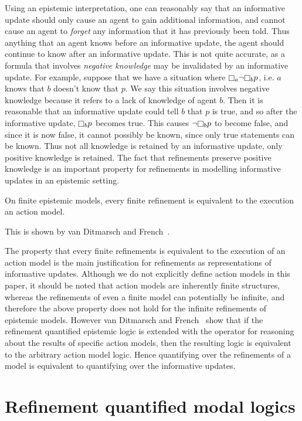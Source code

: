 Using an epistemic interpretation, one can reasonably say that an informative
update should only cause an agent to gain additional information, and cannot
cause an agent to {\em forget} any information that it has previously been told.
Thus anything that an agent knows before an informative update, the agent should
continue to know after an informative update. This is not quite accurate, as a
formula that involves {\em negative knowledge} may be invalidated by an
informative update. For example, suppose that we have a situation where
$\knows_a \neg \knows_b p$, i.e. $a$ knows that $b$ doesn't know that $p$. We
say this situation involves negative knowledge because it refers to a lack of
knowledge of agent $b$. Then it is reasonable that an informative update could
tell $b$ that $p$ is true, and so after the informative update, $\knows_b p$
becomes true.  This causes $\neg \knows_b p$ to become false, and since it is
now false, it cannot possibly be known, since only true statements can be
known. Thus not all knowledge is retained by an informative update, only
positive knowledge is retained. The fact that refinements preserve positive
knowledge is an important property for refinements in modelling informative
updates in an epistemic setting.

\begin{proposition}
On finite epistemic models, every finite refinement is equivalent to the
execution an action model.
\end{proposition}

This is shown by van Ditmarsch and French~\cite{french2009simulation}.

The property that every finite refinements is equivalent to the execution of an
action model is the main justification for refinements as representations of
informative updates. Although we do not explicitly define action models in this
paper, it should be noted that action models are inherently finite structures,
whereas the refinements of even a finite model can potentially be infinite, and
therefore the above property does not hold for the infinite refinements of
epistemic models. However van Ditmarsch and French~\cite{french2009simulation}
show that if the refinement quantified epistemic logic is extended with the
operator for reasoning about the results of specific action models, then the
resulting logic is equivalent to the arbitrary action model logic. Hence
quantifying over the refinements of a model is equivalent to quantifying over
the informative updates.

\section{Refinement quantified modal logics}

